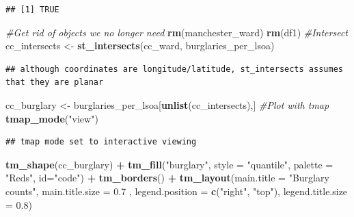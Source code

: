 \documentclass[]{book}
\newenvironment{Shaded}{\begin{snugshade}}{\end{snugshade}}
\newcommand{\CommentTok}[1]{\textcolor[rgb]{0.56,0.35,0.01}{\textit{#1}}}
\newcommand{\DataTypeTok}[1]{\textcolor[rgb]{0.13,0.29,0.53}{#1}}
\newcommand{\FloatTok}[1]{\textcolor[rgb]{0.00,0.00,0.81}{#1}}
\newcommand{\KeywordTok}[1]{\textcolor[rgb]{0.13,0.29,0.53}{\textbf{#1}}}
\newcommand{\NormalTok}[1]{#1}
\newcommand{\OperatorTok}[1]{\textcolor[rgb]{0.81,0.36,0.00}{\textbf{#1}}}
\newcommand{\StringTok}[1]{\textcolor[rgb]{0.31,0.60,0.02}{#1}}
\begin{document}
\begin{verbatim}
## [1] TRUE
\end{verbatim}

\begin{Shaded}
\begin{Highlighting}[]
\CommentTok{#Get rid of objects we no longer need}
\KeywordTok{rm}\NormalTok{(manchester_ward)}
\KeywordTok{rm}\NormalTok{(df1)}
\CommentTok{#Intersect}
\NormalTok{cc_intersects <-}\StringTok{ }\KeywordTok{st_intersects}\NormalTok{(cc_ward, burglaries_per_lsoa)}
\end{Highlighting}
\end{Shaded}

\begin{verbatim}
## although coordinates are longitude/latitude, st_intersects assumes that they are planar
\end{verbatim}

\begin{Shaded}
\begin{Highlighting}[]
\NormalTok{cc_burglary <-}\StringTok{ }\NormalTok{burglaries_per_lsoa[}\KeywordTok{unlist}\NormalTok{(cc_intersects),]}
\CommentTok{#Plot with tmap}
\KeywordTok{tmap_mode}\NormalTok{(}\StringTok{"view"}\NormalTok{)}
\end{Highlighting}
\end{Shaded}

\begin{verbatim}
## tmap mode set to interactive viewing
\end{verbatim}

\begin{Shaded}
\begin{Highlighting}[]
\KeywordTok{tm_shape}\NormalTok{(cc_burglary) }\OperatorTok{+}\StringTok{ }
\StringTok{  }\KeywordTok{tm_fill}\NormalTok{(}\StringTok{"burglary"}\NormalTok{, }\DataTypeTok{style =} \StringTok{"quantile"}\NormalTok{, }\DataTypeTok{palette =} \StringTok{"Reds"}\NormalTok{, }\DataTypeTok{id=}\StringTok{"code"}\NormalTok{) }\OperatorTok{+}
\StringTok{  }\KeywordTok{tm_borders}\NormalTok{() }\OperatorTok{+}
\StringTok{  }\KeywordTok{tm_layout}\NormalTok{(}\DataTypeTok{main.title =} \StringTok{"Burglary counts"}\NormalTok{, }\DataTypeTok{main.title.size =} \FloatTok{0.7}\NormalTok{ ,}
            \DataTypeTok{legend.position =} \KeywordTok{c}\NormalTok{(}\StringTok{"right"}\NormalTok{, }\StringTok{"top"}\NormalTok{), }\DataTypeTok{legend.title.size =} \FloatTok{0.8}\NormalTok{)}
\end{Highlighting}
\end{Shaded}
\end{document}
